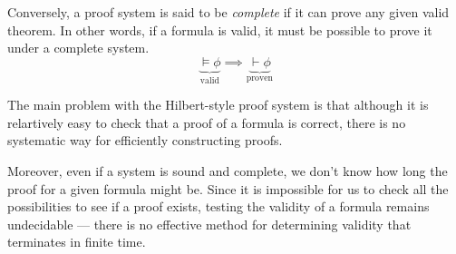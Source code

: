 Conversely, a proof system is said to be \emph{complete} if it can prove any given valid theorem. In other words, if a formula is valid, it must be possible to prove it under a complete system.
%
\begin{equation}
    \underbrace{\models \phi}_{\text{valid}} \implies \underbrace{\vdash \phi}_{\text{proven}} \tag{completeness}
\end{equation}

The main problem with the Hilbert-style proof system is that although it is relartively easy to check that a proof of a formula is correct, there is no systematic way for efficiently constructing proofs.

Moreover, even if a system is sound and complete, we don't know how long the proof for a given formula might be. Since it is impossible for us to check all the possibilities to see if a proof exists, testing the validity of a formula remains undecidable --- there is no effective method for determining validity that terminates in finite time.